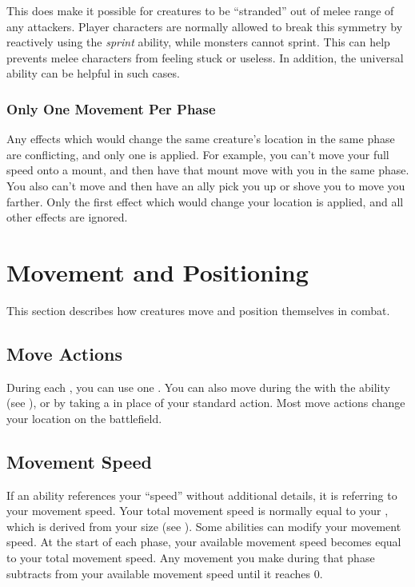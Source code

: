     This does make it possible for creatures to be ``stranded'' out of melee range of any attackers.
    Player characters are normally allowed to break this symmetry by reactively using the \textit{sprint} ability, while monsters cannot sprint.
    This can help prevents melee characters from feeling stuck or useless.
    In addition, the  universal ability can be helpful in such cases.

    \subsubsection{Only One Movement Per Phase}\label{Only One Movement Per Phase}
      Any effects which would change the same creature's location in the same phase are conflicting, and only one is applied.
      For example, you can't move your full speed onto a mount, and then have that mount move with you in the same phase.
      You also can't move and then have an ally pick you up or shove you to move you farther.
      Only the first effect which would change your location is applied, and all other effects are ignored.

\section{Movement and Positioning}\label{Movement and Positioning}
  This section describes how creatures move and position themselves in combat.

  \subsection{Move Actions}\label{Move Actions}
    During each , you can use one .
    You can also move during the  with the  ability (see ), or by taking a  in place of your standard action.
    Most move actions change your location on the battlefield.

  \subsection{Movement Speed}\label{Movement Speed}
    If an ability references your ``speed'' without additional details, it is referring to your movement speed.
    Your total movement speed is normally equal to your , which is derived from your size (see ).
    Some abilities can modify your movement speed.
    At the start of each phase, your available movement speed becomes equal to your total movement speed.
    Any movement you make during that phase subtracts from your available movement speed until it reaches 0.

